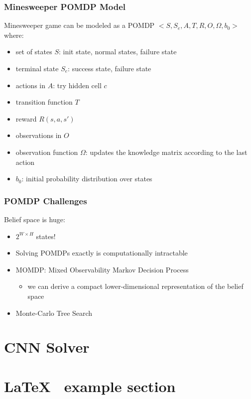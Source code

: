 \documentclass[aspectratio=169]{beamer}
\begin{document}
\begin{frame}
	\frametitle{Minesweeper POMDP Model}
	Minesweeper game can be modeled as a POMDP $<S, S_e, A, T, R, O, \Omega, b_0>$ where:

	\begin{itemize}
		\item set of states $S$: init state, normal states, failure state
		\item terminal state $S_e$: success state, failure state
		\item actions in $A$: try hidden cell $c$
		\item transition function $T$
		\item reward $R(s, a, s')$
		\item observations in $O$
		\item observation function $\Omega$: updates the knowledge matrix according to the last action
		\item $b_0$: initial probability distribution over states
	\end{itemize}
\end{frame}

\begin{frame}
	\frametitle{POMDP Challenges}
	Belief space is huge: 
	\begin{itemize}
		\item $2^{W \times H}$ states!
		\item Solving POMDPs exactly is computationally intractable
		\item MOMDP: Mixed Observability Markov Decision Process
		\begin{itemize}
			\item we can derive a compact lower-dimensional representation of the belief space
		\end{itemize}
		\item Monte-Carlo Tree Search
	\end{itemize}
\end{frame}



\section{CNN Solver}






\section{\LaTeX ~ example section}
\end{document}
